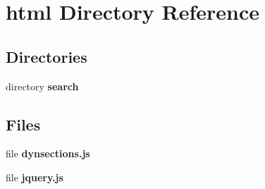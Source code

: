 \section{html Directory Reference}
\label{dir_2dae0a562653f78d59931f0e4b070746}
\subsection*{Directories}
\begin{DoxyCompactItemize}
\item 
directory {\bf search}
\end{DoxyCompactItemize}
\subsection*{Files}
\begin{DoxyCompactItemize}
\item 
file {\bf dynsections.\+js}
\item 
file {\bf jquery.\+js}
\end{DoxyCompactItemize}
